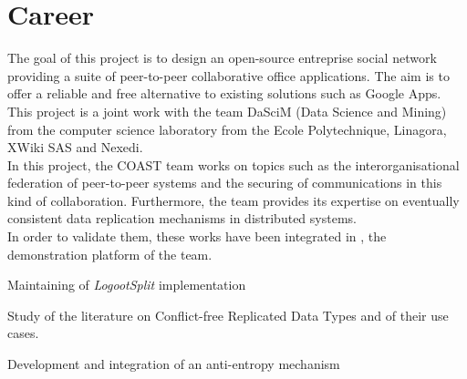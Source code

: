 \documentclass[]{deedy-resume-openfont}
\begin{document}
%
%

%
%

%
%


\section{Career}

\sectionsep

\hfill\begin{minipage}{\dimexpr\textwidth-0.5cm}
The goal of this project is to design an open-source entreprise social network providing a suite of
peer-to-peer collaborative office applications.
The aim is to offer a reliable and free alternative to existing solutions such as Google Apps.
This project is a joint work with the team DaSciM (Data Science and Mining) from the
computer science laboratory from the Ecole Polytechnique, Linagora, XWiki SAS and Nexedi.
\\
In this project, the COAST team works on topics such as the interorganisational federation of
peer-to-peer systems and the securing of communications in this kind of collaboration.
Furthermore, the team provides its expertise
on eventually consistent data replication mechanisms in distributed systems.
\\
In order to validate them, these works have been integrated in \href{https://www.coedit.re}{},
the demonstration platform of the team.
\begin{tightemize}
\item Maintaining of \emph{LogootSplit}\cite{sp2-l2-9}\cite{sp2-l2-10} implementation
\item Study of the literature on Conflict-free Replicated Data Types and of their use cases.
\item Development and integration of an anti-entropy mechanism\cite{sp2-l2-2}
\end{tightemize}
\sectionsep
\end{minipage}
\end{document}

